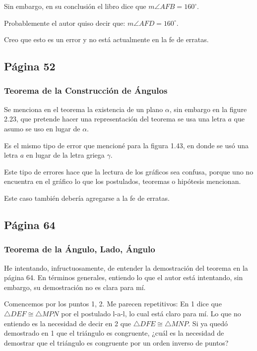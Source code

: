 Sin embargo, en su conclusión el libro dice que \(m\angle{AFB} = 160^{\circ}\).

Probablemente el autor quiso decir que: \(m\angle{AFD} = 160^{\circ}\).

Creo que esto es un error y no está actualmente en la fe de erratas.

\subsection{Página 52}
\subsubsection{Teorema de la Construcción de Ángulos}

Se menciona en el teorema la existencia de un plano \(\alpha\), sin embargo en la figure 2.23, que pretende hacer una representación del teorema se usa una letra \(a\) que asumo se uso en lugar de \(\alpha\).

Es el mismo tipo de error que mencioné para la figura 1.43, en donde se usó una letra \(a\) en lugar de la letra griega \(\gamma\).

Este tipo de errores hace que la lectura de los gráficos sea confusa, porque uno no encuentra en el gráfico lo que los postulados, teoremas o hipótesis mencionan.

Este caso también debería agregarse a la fe de erratas.

\subsection{Página 64}
\subsubsection{Teorema de la Ángulo, Lado, Ángulo}

He intentando, infructuosamente, de entender la demostración del teorema en la página 64. En términos generales, entiendo lo que el autor está intentando, sin embargo, su demostración no es clara para mí.

Comencemos por los puntos 1, 2. Me parecen repetitivos: En 1 dice que \(\triangle{DEF} \cong \triangle{MPN}\) por el postulado l-a-l, lo cual está claro para mí. Lo que no entiendo es la necesidad de decir en 2 que \(\triangle{DFE} \cong \triangle{MNP}\). Si ya quedó demostrado en 1 que el triángulo es congruente, ¿cuál es la necesidad de demostrar que el triángulo es congruente por un orden inverso de puntos?

